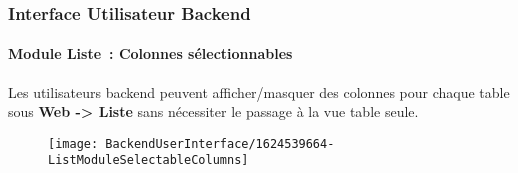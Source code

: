 %

\begin{frame}[fragile]
	\frametitle{Interface Utilisateur Backend}
	\framesubtitle{Module Liste~: Colonnes sélectionnables}

	Les utilisateurs backend peuvent afficher/masquer des colonnes pour chaque table sous
	\textbf{Web -> Liste} sans nécessiter le passage à la vue table seule.

	\begin{figure}
		\texttt{[image: BackendUserInterface/1624539664-ListModuleSelectableColumns]}
	\end{figure}

\end{frame}

